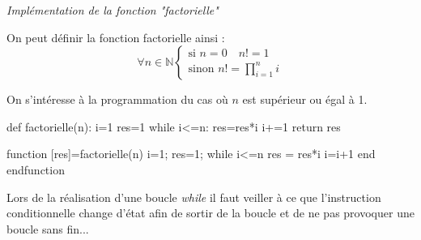 \documentclass[10pt]{article}
\begin{document}
\begin{exemple}
\textit{Implémentation de la fonction "factorielle"}

On peut définir la fonction factorielle ainsi : 
$$
\forall  n\in \mathbb{N}
\left\{
\begin{array}{l}
\text{si } n=0 \quad n!=1\\
\text{sinon } n !=\prod\limits_{i=1}^n i
\end{array}
\right.
$$
 
On s'intéresse à la programmation du cas où $n$ est supérieur ou égal à 1.

\begin{minipage}[c]{.3\linewidth}
\begin{pseudo}
\begin{algorithm}[H]
\end{algorithm}
\end{pseudo}
\end{minipage}\hfill
\begin{minipage}[c]{.3\linewidth}
\begin{py}
\begin{python}
def factorielle(n):
        i=1    
        res=1
        while i<=n:
            res=res*i
            i+=1
        return res
\end{python}
\end{py}
\end{minipage}\hfill
\begin{minipage}[c]{.3\linewidth}
\begin{sci}
\begin{scilab}
function [res]=factorielle(n)
  i=1;
  res=1;
  while i<=n
    res = res*i
    i=i+1
  end
endfunction
\end{scilab}
\end{sci}
\end{minipage}

\end{exemple}



\begin{warn}
Lors de la réalisation d'une boucle \textsl{while} il faut veiller à ce que l'instruction conditionnelle change d'état afin de sortir de la boucle et de ne pas provoquer une boucle sans fin...
\end{warn}
\end{document}
